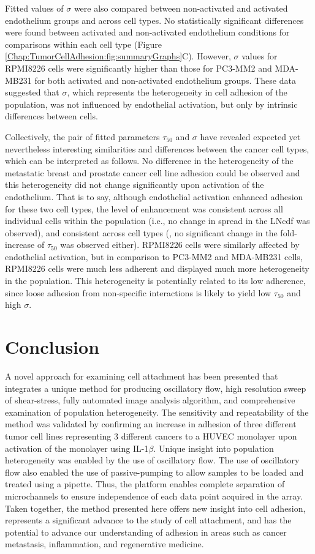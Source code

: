 Fitted values of $\sigma$ were also compared between non-activated and activated endothelium groups and  across cell types. No statistically significant differences were found between activated and non-activated endothelium conditions for comparisons within each cell type (Figure \ref{Chap:TumorCellAdhesion:fig:summaryGraphs}C). However, $\sigma$ values for RPMI8226 cells were significantly higher than those for PC3-MM2 and MDA-MB231 for both activated and non-activated endothelium groups. These data suggested that $\sigma$, which represents the heterogeneity in cell adhesion of the population, was not influenced by endothelial activation, but only by intrinsic differences between cells. 

Collectively, the pair of fitted parameters $\tau_{50}$ and $\sigma$ have revealed expected yet nevertheless interesting similarities and differences between the cancer cell types, which can be interpreted as follows. No difference in the heterogeneity of the metastatic breast and prostate cancer cell line adhesion could be observed and this heterogeneity did not change significantly upon activation of the endothelium. That is to say, although endothelial activation enhanced adhesion for these two cell types, the level of enhancement was consistent across all individual cells within the population (i.e., no change in spread in the LNcdf was observed), and consistent across cell types (\ie, no significant change in the fold-increase of $\tau_{50}$ was observed either). RPMI8226 cells were similarly affected by endothelial activation, but in comparison to PC3-MM2 and MDA-MB231 cells, RPMI8226 cells were much less adherent and displayed much more heterogeneity in the population. This heterogeneity is potentially related to its low adherence, since loose adhesion from non-specific interactions is likely to yield low $\tau_{50}$ and high $\sigma$. 

\section{Conclusion}
A novel approach for examining cell attachment has been presented that integrates a unique method for producing oscillatory flow, high resolution sweep of shear-stress, fully automated image analysis algorithm, and comprehensive examination of population heterogeneity. The sensitivity and repeatability of the method was validated by confirming an increase in adhesion of three different tumor cell lines representing 3 different cancers to a HUVEC monolayer upon activation of the monolayer using IL-1$\beta$. Unique insight into population heterogeneity was enabled by the use of oscillatory flow. The use of oscillatory flow also enabled the use of passive-pumping to allow samples to be loaded and treated using a pipette. Thus, the platform enables complete separation of microchannels to ensure independence of each data point acquired in the array. Taken together, the method presented here offers new insight into cell adhesion, represents a significant advance to the study of cell attachment, and has the potential to advance our understanding of adhesion in areas such as cancer metastasis, inflammation, and regenerative medicine.

